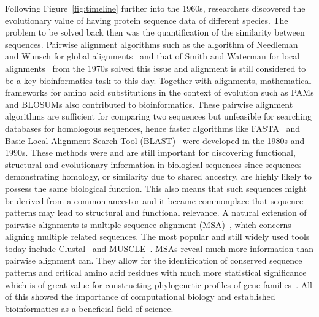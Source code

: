Following Figure~\ref{fig:timeline} further into the 1960s, researchers discovered the evolutionary value of having protein sequence data of different species. The problem to be solved back then was the quantification of the similarity between sequences. Pairwise alignment algorithms such as the algorithm of Needleman and Wunsch for global alignments~\cite{global} and that of Smith and Waterman for local alignments~\cite{local} from the 1970s solved this issue and alignment is still considered to be a key bioinformatics task to this day. Together with alignments, mathematical frameworks for amino acid substitutions in the context of evolution such as PAMs and BLOSUMs also contributed to bioinformatics. These pairwise alignment algorithms are sufficient for comparing two sequences but unfeasible for searching databases for homologous sequences, hence faster algorithms like FASTA~\cite{fasta} and Basic Local Alignment Search Tool (BLAST)~\cite{blast} were developed in the 1980s and 1990s. These methods were and are still important for discovering functional, structural and evolutionary information in biological sequences since sequences demonstrating homology, or similarity due to shared ancestry, are highly likely to possess the same biological function. This also means that such sequences might be derived from a common ancestor and it became commonplace that sequence patterns may lead to structural and functional relevance. A natural extension of pairwise alignments is multiple sequence alignment (MSA)~\cite{msa}, which concerns aligning multiple related sequences. The most popular and still widely used tools today include Clustal~\cite{clustal} and MUSCLE~\cite{muscle}. MSAs reveal much more information than pairwise alignment can. They allow for the identification of conserved sequence patterns and critical amino acid residues with much more statistical significance which is of great value for constructing phylogenetic profiles of gene families~\cite{phylo}. All of this showed the importance of computational biology and established bioinformatics as a beneficial field of science.

